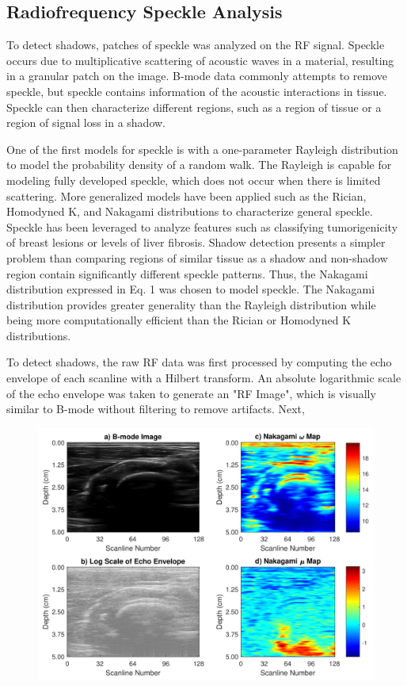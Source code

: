 \documentclass[preprint,5p]{elsarticle}
\begin{document}
\subsection*{Radiofrequency Speckle Analysis}      
To detect shadows, patches of speckle was analyzed on the RF signal. Speckle occurs due to multiplicative scattering of acoustic waves in a material, resulting in a granular patch on the image. B-mode data commonly attempts to remove speckle, but speckle contains information of the acoustic interactions in tissue. Speckle can then characterize different regions, such as a region of tissue or a region of signal loss in a shadow.

One of the first models for speckle is with a one-parameter Rayleigh distribution to model the probability density of a random walk. The Rayleigh is capable for modeling fully developed speckle, which does not occur when there is limited scattering. More generalized models have been applied such as the Rician, Homodyned K, and Nakagami distributions to characterize general speckle. Speckle has been leveraged to analyze features such as classifying tumorigenicity of breast lesions or levels of liver fibrosis. Shadow detection presents a simpler problem than comparing regions of similar tissue as a shadow and non-shadow region contain significantly different speckle patterns. Thus, the Nakagami distribution expressed in Eq. 1 was chosen to model speckle. The Nakagami distribution provides greater generality than the Rayleigh distribution while being more computationally efficient than the Rician or Homodyned K distributions.

To detect shadows, the raw RF data was first processed by computing the echo envelope of each scanline with a Hilbert transform. An absolute logarithmic scale of the echo envelope was taken to generate an "RF Image", which is visually similar to B-mode without filtering to remove artifacts. Next,

\begin{figure}
	\includegraphics[scale=0.5]{fig2.pdf}
\end{figure}
\end{document}
